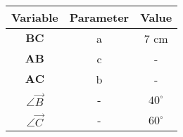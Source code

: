 \begin{center}
    \begin{tabular}{|c|c|c|} 
        \hline
            \textbf{Variable} & \textbf{Parameter} & \textbf{Value} \\ 
        \hline
            $\boldsymbol{BC}$ & a & 7 cm \\ 
        \hline
            $\boldsymbol{AB}$ & c & - \\ 
        \hline
            $\boldsymbol{AC}$ & b &   -    \\
        \hline
            $\angle \vec{B}$  & -  & $40^\circ$ \\
        \hline
	    $\angle \vec{C}$ & - & $60^\circ$ \\
	\hline 
    \end{tabular}
\end{center}  


